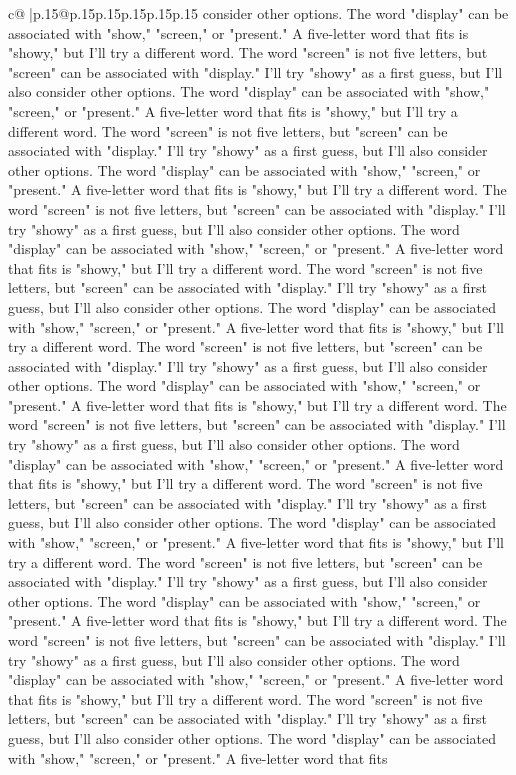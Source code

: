 \documentclass{article}
\begin{document}
{\begin{supertabular}{c@{$\;$}|p{.15\linewidth}@{}p{.15\linewidth}p{.15\linewidth}p{.15\linewidth}p{.15\linewidth}p{.15\linewidth}}
{{{consider other options. The word "display" can be associated with "show," "screen," or "present." A five{-}letter word that fits is "showy," but I'll try a different word. The word "screen" is not five letters, but "screen" can be associated with "display." I'll try "showy" as a first guess, but I'll also consider other options. The word "display" can be associated with "show," "screen," or "present." A five{-}letter word that fits is "showy," but I'll try a different word. The word "screen" is not five letters, but "screen" can be associated with "display." I'll try "showy" as a first guess, but I'll also consider other options. The word "display" can be associated with "show," "screen," or "present." A five{-}letter word that fits is "showy," but I'll try a different word. The word "screen" is not five letters, but "screen" can be associated with "display." I'll try "showy" as a first guess, but I'll also consider other options. The word "display" can be associated with "show," "screen," or "present." A five{-}letter word that fits is "showy," but I'll try a different word. The word "screen" is not five letters, but "screen" can be associated with "display." I'll try "showy" as a first guess, but I'll also consider other options. The word "display" can be associated with "show," "screen," or "present." A five{-}letter word that fits is "showy," but I'll try a different word. The word "screen" is not five letters, but "screen" can be associated with "display." I'll try "showy" as a first guess, but I'll also consider other options. The word "display" can be associated with "show," "screen," or "present." A five{-}letter word that fits is "showy," but I'll try a different word. The word "screen" is not five letters, but "screen" can be associated with "display." I'll try "showy" as a first guess, but I'll also consider other options. The word "display" can be associated with "show," "screen," or "present." A five{-}letter word that fits is "showy," but I'll try a different word. The word "screen" is not five letters, but "screen" can be associated with "display." I'll try "showy" as a first guess, but I'll also consider other options. The word "display" can be associated with "show," "screen," or "present." A five{-}letter word that fits is "showy," but I'll try a different word. The word "screen" is not five letters, but "screen" can be associated with "display." I'll try "showy" as a first guess, but I'll also consider other options. The word "display" can be associated with "show," "screen," or "present." A five{-}letter word that fits is "showy," but I'll try a different word. The word "screen" is not five letters, but "screen" can be associated with "display." I'll try "showy" as a first guess, but I'll also consider other options. The word "display" can be associated with "show," "screen," or "present." A five{-}letter word that fits is "showy," but I'll try a different word. The word "screen" is not five letters, but "screen" can be associated with "display." I'll try "showy" as a first guess, but I'll also consider other options. The word "display" can be associated with "show," "screen," or "present." A five{-}letter word that fits }}}
\end{supertabular}}
\end{document}

